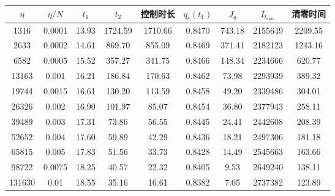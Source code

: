 \begin{tabular}{ccccccccc}
\toprule
$\eta$ & $\eta/N$ & $t_1$ & $t_2$ & 控制时长 & $q_c(t_1)$ & $J_q$ & $I_{t_{cum}}$ & 清零时间 \\
\midrule
1316 & 0.0001 & 13.93 & 1724.59 & 1710.66 & 0.8470 & 743.18 & 2155649 & 2209.55 \\
2633 & 0.0002 & 14.61 & 869.70 & 855.09 & 0.8469 & 371.41 & 2182123 & 1243.16 \\
6582 & 0.0005 & 15.52 & 357.27 & 341.75 & 0.8466 & 148.34 & 2234666 & 620.77 \\
13163 & 0.001 & 16.21 & 186.84 & 170.63 & 0.8462 & 73.98 & 2293939 & 389.32 \\
19744 & 0.0015 & 16.61 & 130.20 & 113.59 & 0.8458 & 49.20 & 2339486 & 304.01 \\
26326 & 0.002 & 16.90 & 101.97 & 85.07 & 0.8454 & 36.80 & 2377943 & 258.11 \\
39489 & 0.003 & 17.31 & 73.86 & 56.55 & 0.8445 & 24.41 & 2442608 & 208.39 \\
52652 & 0.004 & 17.60 & 59.89 & 42.29 & 0.8436 & 18.21 & 2497306 & 181.18 \\
65815 & 0.005 & 17.83 & 51.56 & 33.73 & 0.8428 & 14.49 & 2545663 & 163.66 \\
98722 & 0.0075 & 18.25 & 40.57 & 22.32 & 0.8405 & 9.53 & 2649240 & 138.11 \\
131630 & 0.01 & 18.55 & 35.16 & 16.61 & 0.8382 & 7.05 & 2737382 & 123.89 \\
\bottomrule
\end{tabular}
